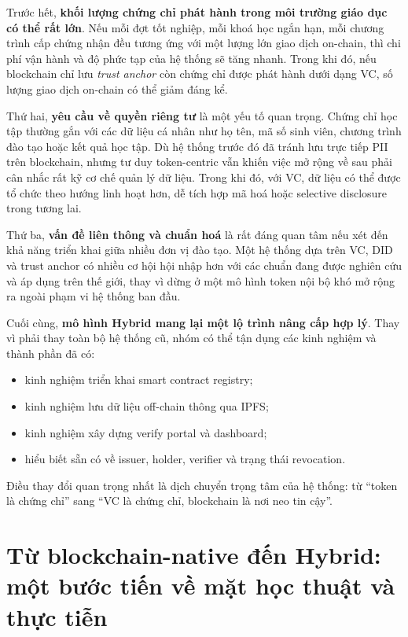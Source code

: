 Trước hết, \textbf{khối lượng chứng chỉ phát hành trong môi trường giáo dục có thể rất lớn}. Nếu mỗi đợt tốt nghiệp, mỗi khoá học ngắn hạn, mỗi chương trình cấp chứng nhận đều tương ứng với một lượng lớn giao dịch on-chain, thì chi phí vận hành và độ phức tạp của hệ thống sẽ tăng nhanh. Trong khi đó, nếu blockchain chỉ lưu \textit{trust anchor} còn chứng chỉ được phát hành dưới dạng VC, số lượng giao dịch on-chain có thể giảm đáng kể.

Thứ hai, \textbf{yêu cầu về quyền riêng tư} là một yếu tố quan trọng. Chứng chỉ học tập thường gắn với các dữ liệu cá nhân như họ tên, mã số sinh viên, chương trình đào tạo hoặc kết quả học tập. Dù hệ thống trước đó đã tránh lưu trực tiếp PII trên blockchain, nhưng tư duy token-centric vẫn khiến việc mở rộng về sau phải cân nhắc rất kỹ cơ chế quản lý dữ liệu. Trong khi đó, với VC, dữ liệu có thể được tổ chức theo hướng linh hoạt hơn, dễ tích hợp mã hoá hoặc selective disclosure trong tương lai.

Thứ ba, \textbf{vấn đề liên thông và chuẩn hoá} là rất đáng quan tâm nếu xét đến khả năng triển khai giữa nhiều đơn vị đào tạo. Một hệ thống dựa trên VC, DID và trust anchor có nhiều cơ hội hội nhập hơn với các chuẩn đang được nghiên cứu và áp dụng trên thế giới, thay vì dừng ở một mô hình token nội bộ khó mở rộng ra ngoài phạm vi hệ thống ban đầu.

Cuối cùng, \textbf{mô hình Hybrid mang lại một lộ trình nâng cấp hợp lý}. Thay vì phải thay toàn bộ hệ thống cũ, nhóm có thể tận dụng các kinh nghiệm và thành phần đã có:
\begin{itemize}
    \item kinh nghiệm triển khai smart contract registry;
    \item kinh nghiệm lưu dữ liệu off-chain thông qua IPFS;
    \item kinh nghiệm xây dựng verify portal và dashboard;
    \item hiểu biết sẵn có về issuer, holder, verifier và trạng thái revocation.
\end{itemize}

Điều thay đổi quan trọng nhất là dịch chuyển trọng tâm của hệ thống: từ ``token là chứng chỉ'' sang ``VC là chứng chỉ, blockchain là nơi neo tin cậy''.

\section{Từ blockchain-native đến Hybrid: một bước tiến về mặt học thuật và thực tiễn}

